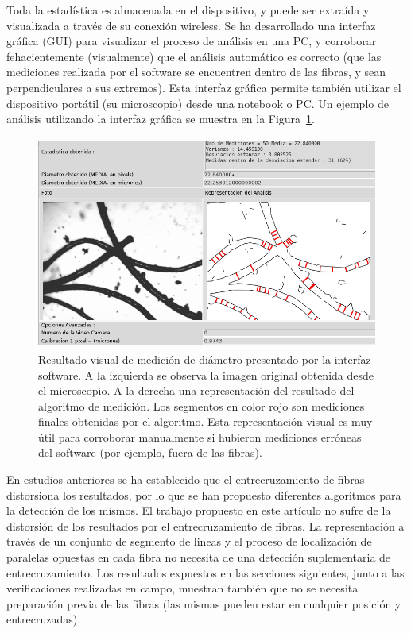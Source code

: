 \documentclass[runningheads,a4paper]{llncs}
\begin{document}
Toda la estadística es almacenada en el dispositivo, y puede ser extraída y visualizada a través de su conexión wireless. Se ha desarrollado una interfaz gráfica (GUI) para visualizar el proceso de análisis en una PC, y corroborar fehacientemente (visualmente) que el análisis automático es correcto (que las mediciones realizada por el software se encuentren dentro de las fibras, y sean perpendiculares a sus extremos). Esta interfaz gráfica permite también utilizar el dispositivo portátil (su microscopio) desde una notebook o PC. Un ejemplo de análisis utilizando la interfaz gráfica se muestra en la Figura~\ref{fig:captura2}.
\begin{figure}
\centering
\includegraphics[height=7cm]{captura2}
\caption{Resultado visual de medición de diámetro presentado por la interfaz software. A la izquierda se observa la imagen original obtenida desde el microscopio. A la derecha una representación del resultado del algoritmo de medición. Los segmentos en color rojo son mediciones finales obtenidas por el algoritmo. Esta representación visual es muy útil para corroborar manualmente si hubieron mediciones erróneas del software (por ejemplo, fuera de las fibras).
}
\label{fig:captura2}
\end{figure}




En estudios anteriores se ha establecido que el entrecruzamiento de fibras distorsiona los resultados, por lo que se han propuesto diferentes algoritmos para la detección de los mismos.
El trabajo propuesto en este artículo no sufre de la distorsión de los resultados por el entrecruzamiento de fibras. 
La representación a través de un conjunto de segmento de lineas y el proceso de localización de paralelas opuestas en cada fibra no necesita de una detección suplementaria de entrecruzamiento. Los resultados expuestos en las secciones siguientes, junto a las verificaciones realizadas en campo, muestran también que no se necesita preparación previa de las fibras (las mismas pueden estar en cualquier posición y entrecruzadas).
\end{document}
